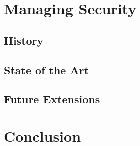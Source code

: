 \documentclass{sig-alternate}
\begin{document}
\section{Managing Security}
\label{sec:mgmt}

\subsection{History}

\subsection{State of the Art}

\subsection{Future Extensions}




\section{Conclusion}
\label{sec:conclusion}



\end{document}
